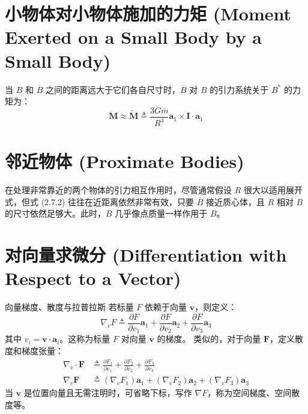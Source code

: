 \section{小物体对小物体施加的力矩 (Moment Exerted on a Small Body by a Small Body)}

当 \(B\) 和 \(\overline{B}\) 之间的距离远大于它们各自尺寸时，\(\overline{B}\) 对 \(B\) 的引力系统关于 \(B^*\) 的力矩为：
\begin{equation}
\mathbf{M} \approx \widetilde{\mathbf{M}} \triangleq \frac{3G\overline{m}}{R^3}\mathbf{a}_1\times\mathbf{I}\cdot\mathbf{a}_1 \tag{2}
\end{equation}

\section{邻近物体 (Proximate Bodies)}

在处理非常靠近的两个物体的引力相互作用时，尽管通常假设 \(R\) 很大以适用展开式，但式 (2.7.2) 往往在近距离依然非常有效，只要 \(\overline{B}\) 接近质心体，且 \(R\) 相对 \(B\) 的尺寸依然足够大。此时，\(\overline{B}\) 几乎像点质量一样作用于 \(B\)。

\section{对向量求微分 (Differentiation with Respect to a Vector)}

\begin{mydefinition}{向量梯度、散度与拉普拉斯}
若标量 \(F\) 依赖于向量 \(\mathbf{v}\)，则定义：
\begin{equation}
\nabla_v F \triangleq \frac{\partial F}{\partial v_1}\mathbf{a}_1 + \frac{\partial F}{\partial v_2}\mathbf{a}_2 + \frac{\partial F}{\partial v_3}\mathbf{a}_3 \tag{1}
\end{equation}
其中 \(v_i = \mathbf{v}\cdot\mathbf{a}_i\)。这称为标量 \(F\) 对向量 \(\mathbf{v}\) 的梯度。
类似的，对于向量 \(\mathbf{F}\)，定义散度和梯度张量：
\begin{align}
\nabla_v \cdot \mathbf{F} &\triangleq \frac{\partial F_1}{\partial v_1} + \frac{\partial F_2}{\partial v_2} + \frac{\partial F_3}{\partial v_3} \tag{2} \\
\nabla_v \mathbf{F} &\triangleq (\nabla_v F_1)\mathbf{a}_1 + (\nabla_v F_2)\mathbf{a}_2 + (\nabla_v F_3)\mathbf{a}_3 \tag{3}
\end{align}
当 \(\mathbf{v}\) 是位置向量且无需注明时，可省略下标，写作 \(\nabla F\)，称为空间梯度、空间散度等。
\end{mydefinition}

